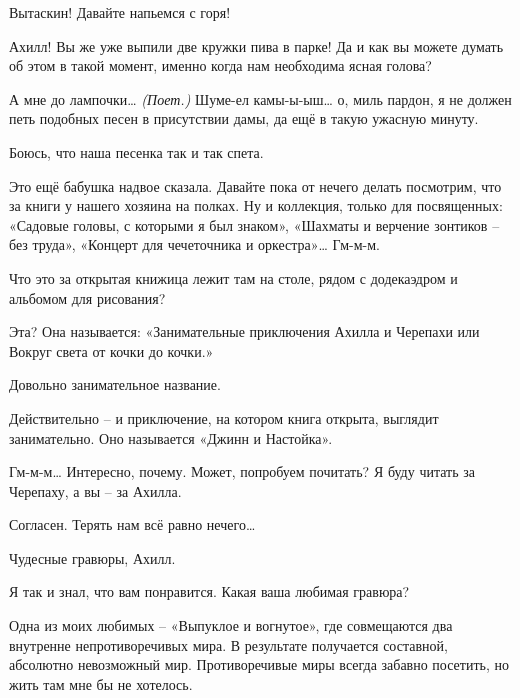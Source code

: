\documentclass[../main.tex]{subfiles}
\begin{document}
\begin{Dialogue}
 Вытаскин! Давайте напьемся с горя!

 Ахилл! Вы же уже выпили две кружки пива в парке! Да и как вы можете думать об этом в такой момент, именно когда нам необходима ясная голова?

 А мне до лампочки\ldots{} \emph{(Поет.)} Шуме-ел камы-ы-ыш\ldots{} о, миль пардон, я не должен петь подобных песен в присутствии дамы, да ещё в такую ужасную минуту.

 Боюсь, что наша песенка так и так спета.

 Это ещё бабушка надвое сказала. Давайте пока от нечего делать посмотрим, что за книги у нашего хозяина на полках. Ну и коллекция, только для посвященных: «Садовые головы, с которыми я был знаком», «Шахматы и верчение зонтиков \--- без труда», «Концерт для чечеточника и оркестра»\ldots{} Гм-м-м.

 Что это за открытая книжица лежит там на столе, рядом с додекаэдром и альбомом для рисования?

 Эта? Она называется: «Занимательные приключения Ахилла и Черепахи или Вокруг света от кочки до кочки.»

 Довольно занимательное название.

 Действительно \--- и приключение, на котором книга открыта, выглядит занимательно. Оно называется «Джинн и Настойка».

 Гм-м-м\ldots{} Интересно, почему. Может, попробуем почитать? Я буду читать за Черепаху, а вы \--- за Ахилла.

 Согласен. Терять нам всё равно нечего\ldots{}



\begin{sublevel}



 Чудесные гравюры, Ахилл.

 Я так и знал, что вам понравится. Какая ваша любимая гравюра?

 Одна из моих любимых \--- «Выпуклое и вогнутое», где совмещаются два внутренне непротиворечивых мира. В результате получается составной, абсолютно невозможный мир. Противоречивые миры всегда забавно посетить, но жить там мне бы не хотелось.


\end{sublevel}
\end{Dialogue}
\end{document}
